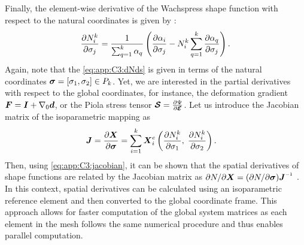 Finally, the element-wise derivative of the Wachspress shape function with respect to the natural coordinates is given by \cite{Talischi2012Mar}:
%
\begin{equation}
\frac{\partial N^k_i}{\partial \sigma_j}= \frac{1}{\sum_{q=1}^k \alpha_q} \left(\frac{\partial \alpha_i}{\partial \sigma_j} - N_{i}^k \sum^{k}_{q=1} \frac{\partial \alpha_q}{\partial \sigma_j} \right).
\label{eq:app:C3:dNds}
\end{equation}
%
Again, note that the \eqref{eq:app:C3:dNds} is given in terms of the natural coordinates $\boldsymbol{\sigma} = [\sigma_1, \sigma_2] \in P_k$. Yet, we are interested in the partial derivatives with respect to the global coordinates, for instance, the deformation gradient ${\boldsymbol{F}} = \boldsymbol{I} + \nabla_0 {\boldsymbol{d}}$, or the Piola stress tensor $\boldsymbol{\mathcal{S}} = \frac{\partial \Psi}{\partial \boldsymbol{\mathcal{E}}}$. Let us introduce the Jacobian matrix of the isoparametric mapping as
%
\begin{align}
{\boldsymbol{J}} & = \frac{\partial {\boldsymbol{X}}}{\partial \boldsymbol{\sigma}} = \sum_{i=1}^k {\boldsymbol{X}}_i^{e} \left(\frac{\partial N^k_i}{\partial \sigma_1}, \; \frac{\partial N^k_i}{\partial \sigma_2} \right).
\label{eq:app:C3:jacobian}
\end{align}
%
Then, using \eqref{eq:app:C3:jacobian}, it can be shown that the spatial derivatives of shape functions are related by the Jacobian matrix as $\p N/\p \XB = (\p N/\p \sigmaB) \JB\inv$ \cite{Kim2018}. In this context, spatial derivatives can be calculated using an isoparametric reference element and then converted to the global coordinate frame. This approach allows for faster computation of the global system matrices as each element in the mesh follows the same numerical procedure and thus enables parallel computation.